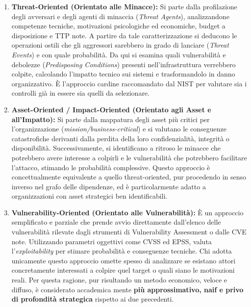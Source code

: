 \documentclass[../../main.tex]{subfiles}
\begin{document}
\begin{enumerate}
    \item \textbf{Threat-Oriented (Orientato alle Minacce):} Si parte dalla profilazione degli avversari e degli agenti di minaccia (\textit{Threat Agents}), analizzandone competenze tecniche, motivazioni psicologiche ed economiche, budget a disposizione e TTP note. A partire da tale caratterizzazione si deducono le operazioni ostili che gli aggressori sarebbero in grado di lanciare (\textit{Threat Events}) e con quale probabilità. Da qui si esamina quali vulnerabilità e debolezze (\textit{Predisposing Conditions}) presenti nell'infrastruttura verrebbero colpite, calcolando l'impatto tecnico sui sistemi e trasformandolo in danno organizzativo. È l'approccio cardine raccomandato dal NIST per valutare sia i controlli già in essere sia quelli da selezionare.
    
    \item \textbf{Asset-Oriented / Impact-Oriented (Orientato agli Asset e all'Impatto):} Si parte dalla mappatura degli asset più critici per l'organizzazione (\textit{mission/business-critical}) e si valutano le conseguenze catastrofiche derivanti dalla perdita della loro confidenzialità, integrità o disponibilità. Successivamente, si identificano a ritroso le minacce che potrebbero avere interesse a colpirli e le vulnerabilità che potrebbero facilitare l'attacco, stimando le probabilità complessive. Questo approccio è concettualmente equivalente a quello threat-oriented, pur procedendo in senso inverso nel grafo delle dipendenze, ed è particolarmente adatto a organizzazioni con asset strategici ben identificabili.
    
    \item \textbf{Vulnerability-Oriented (Orientato alle Vulnerabilità):} È un approccio semplificato e parziale che prende avvio direttamente dall'elenco delle vulnerabilità rilevate dagli strumenti di Vulnerability Assessment o dalle CVE note. Utilizzando parametri oggettivi come CVSS ed EPSS, valuta l'\textit{exploitability} per stimare probabilità e conseguenze tecniche. Chi adotta unicamente questo approccio omette spesso di analizzare se esistano attori concretamente interessati a colpire quel target o quali siano le motivazioni reali. Per questa ragione, pur risultando un metodo economico, veloce e diffuso, è considerato accademica mente \textbf{più approssimativo, naif e privo di profondità strategica} rispetto ai due precedenti.
\end{enumerate}
\end{document}
